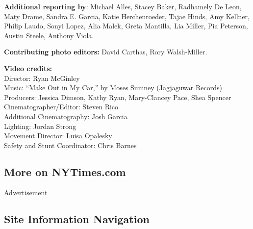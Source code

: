 \textbf{Additional reporting by}: Michael Alles, Stacey Baker, Radhamely
De Leon, Maty Drame, Sandra E. Garcia, Katie Herchenroeder, Tajae Hinds,
Amy Kellner, Philip Laudo, Sonyi Lopez, Alia Malek, Greta Mantilla, Lia
Miller, Pia Peterson, Austin Steele, Anthony Viola.

\textbf{Contributing photo editors:} David Carthas, Rory Walsh-Miller.

\textbf{Video credits:}\\
Director: Ryan McGinley\\
Music: ``Make Out in My Car,'' by Moses Sumney (Jagjaguwar Records)\\
Producers: Jessica Dimson, Kathy Ryan, Mary-Clancey Pace, Shea Spencer\\
Cinematographer/Editor: Steven Rico\\
Additional Cinematography: Josh Garcia\\
Lighting: Jordan Strong\\
Movement Director: Luisa Opalesky\\
Safety and Stunt Coordinator: Chris Barnes

\hypertarget{more-on-nytimescom}{%
\subsection{More on NYTimes.com}\label{more-on-nytimescom}}

Advertisement

\hypertarget{site-information-navigation}{%
\subsection{Site Information
Navigation}\label{site-information-navigation}}


